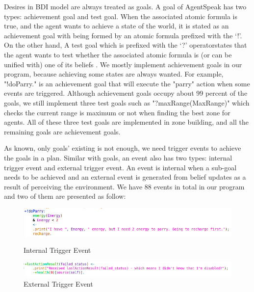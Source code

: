 \documentclass{llncs}
\begin{document}
Desires in BDI model are always treated as goals. A goal of AgentSpeak has two types: achievement goal and test goal. When the associated atomic formula is true, and the agent wants to achieve a state of the world, it is stated as an achievement goal with being formed by an atomic formula prefixed with the ‘!’. On the other hand, A test goal which is prefixed with the ‘?’ operatorstates that the agent wants to test whether the associated atomic formula is (or can be unified with) one of its beliefs \cite{rafael_BDIAgent_2005}. We mostly implement achievement goals in our program, because achieving some states are always wanted. For example, "!doParry." is an achievement goal that will execute the "parry" action when some events are triggered. Although achievement goals occupy about 99 percent of the goals, we still implement three test goals such as "?maxRange(MaxRange)" which checks the current range is maximum or not when finding the best zone for agents. All of these three test goals are implemented in zone building, and all the remaining goals are achievement goals.

As known, only goals' existing is not enough, we need trigger events to achieve the goals in a plan. Similar with goals, an event also has two types: internal trigger event and external trigger event. An event is internal when a sub-goal needs to be achieved and an external event is generated from belief updates as a result of perceiving the environment. We have 88 events in total in our program and two of them are presented as follow:
\begin{figure}
\centering%
\begin{minipage}[!htbp]{\linewidth}
\includegraphics[width=5.0in]{images/BDI_trigger_event_Inter}
\caption{Internal Trigger Event}
\label{fig:latticen}
\end{minipage}
\begin{minipage}[!htbp]{\linewidth}
\includegraphics[width=5.0in]{images/BDI_trigger_event_Exter}
\caption{External Trigger Event}
\label{fig:baselinex}
\end{minipage}
\end{figure}
\end{document}

